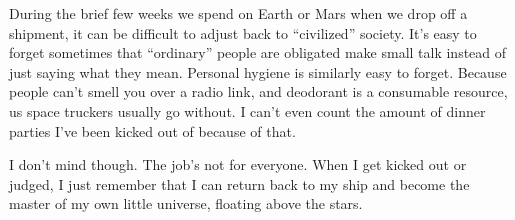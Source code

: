\documentclass[main.tex]{subfiles}
\begin{document}
During the brief few weeks we spend on Earth or Mars when we drop off a shipment, it can be difficult to adjust back to
“civilized” society. 
It's easy to forget sometimes that “ordinary” people are obligated make small talk instead of just saying what
they mean.  
Personal hygiene is similarly easy to forget.  
Because people can’t smell you over a radio link, and deodorant is a consumable resource, us space truckers usually go without.  
I can’t even count the amount of dinner parties I’ve been kicked out of because of that.

I don't mind though.  
The job's not for everyone.  
When I get kicked out or judged, I just remember that I can return back to my ship and become the master of my
own little universe, floating above the stars.
\end{document}
